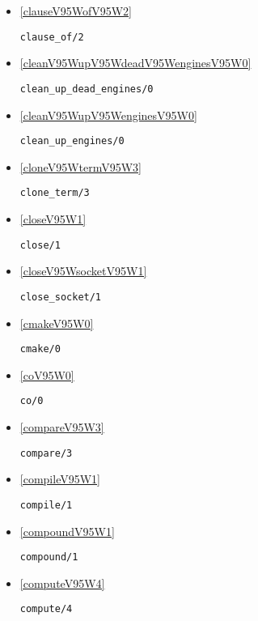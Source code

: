 \begin{itemize}
\item \ref{clauseV95WofV95W2} 
\begin{verbatim}
clause_of/2
\end{verbatim}

\item \ref{cleanV95WupV95WdeadV95WenginesV95W0} 
\begin{verbatim}
clean_up_dead_engines/0
\end{verbatim}

\item \ref{cleanV95WupV95WenginesV95W0} 
\begin{verbatim}
clean_up_engines/0
\end{verbatim}

\item \ref{cloneV95WtermV95W3} 
\begin{verbatim}
clone_term/3
\end{verbatim}

\item \ref{closeV95W1} 
\begin{verbatim}
close/1
\end{verbatim}

\item \ref{closeV95WsocketV95W1} 
\begin{verbatim}
close_socket/1
\end{verbatim}

\item \ref{cmakeV95W0} 
\begin{verbatim}
cmake/0
\end{verbatim}

\item \ref{coV95W0} 
\begin{verbatim}
co/0
\end{verbatim}

\item \ref{compareV95W3} 
\begin{verbatim}
compare/3
\end{verbatim}

\item \ref{compileV95W1} 
\begin{verbatim}
compile/1
\end{verbatim}

\item \ref{compoundV95W1} 
\begin{verbatim}
compound/1
\end{verbatim}

\item \ref{computeV95W4} 
\begin{verbatim}
compute/4
\end{verbatim}


\end{itemize}
